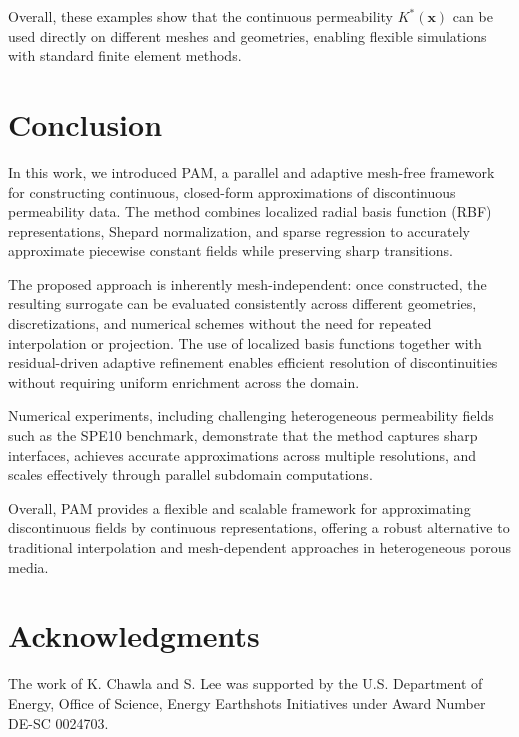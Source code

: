 \documentclass[final,1p,times]{elsarticle}
\theoremstyle{plain}
\theoremstyle{definition}
\theoremstyle{remark}
\newcommand{\bx}{\mathbf{x}}
\begin{document}
Overall, these examples show that the continuous permeability $K^*(\bx)$ can be used directly on different meshes and geometries, enabling flexible simulations with standard finite element methods.



\section{Conclusion}

In this work, we introduced PAM, a parallel and adaptive mesh-free framework for constructing continuous, closed-form approximations of discontinuous permeability data. The method combines localized radial basis function (RBF) representations, Shepard normalization, and sparse regression to accurately approximate piecewise constant fields while preserving sharp transitions.

The proposed approach is inherently mesh-independent: once constructed, the resulting surrogate can be evaluated consistently across different geometries, discretizations, and numerical schemes without the need for repeated interpolation or projection. The use of localized basis functions together with residual-driven adaptive refinement enables efficient resolution of discontinuities without requiring uniform enrichment across the domain.

Numerical experiments, including challenging heterogeneous permeability fields such as the SPE10 benchmark, demonstrate that the method captures sharp interfaces, achieves accurate approximations across multiple resolutions, and scales effectively through parallel subdomain computations.

Overall, PAM provides a flexible and scalable framework for approximating discontinuous fields by continuous representations, offering a robust alternative to traditional interpolation and mesh-dependent approaches in heterogeneous porous media.

\section*{Acknowledgments}
The work of K. Chawla and S. Lee was supported by the U.S. Department of Energy, Office of Science, Energy Earthshots Initiatives under Award Number DE-SC 0024703.

 

\end{document}
